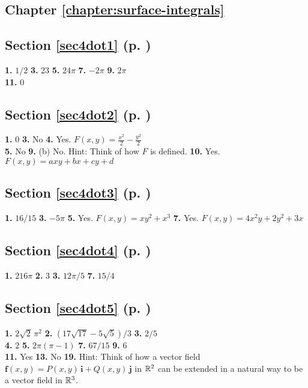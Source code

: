 \begin{multicols}{2}
\section*{Chapter \ref{chapter:surface-integrals}}
\subsection*{Section \ref{sec4dot1} (p. \pageref{sec4dot1})}
\textbf{1.} $1/2$\quad
\textbf{3.} $23$\quad
\textbf{5.} $24\pi$\quad
\textbf{7.} $-2\pi$\quad
\textbf{9.} $2\pi$\\\textbf{11.} $0$
\subsection*{Section \ref{sec4dot2} (p. \pageref{sec4dot2})}
\textbf{1.} $0$\quad
\textbf{3.} No\quad
\textbf{4.} Yes. $F(x,y)=\frac{x^2}{2}-\frac{y^2}{2}$\\
\textbf{5.} No\quad
\textbf{9.} (b) No. Hint: Think of how $F$ is defined.\quad
\textbf{10.} Yes. $F(x,y)=axy+bx+cy+d$
\subsection*{Section \ref{sec4dot3} (p. \pageref{sec4dot3})}
\textbf{1.} $16/15$\quad
\textbf{3.} $-5\pi$\quad
\textbf{5.} Yes. $F(x,y)=xy^2 + x^3$\quad
\textbf{7.} Yes. $F(x,y)=4x^2 y + 2y^2 + 3x$
\subsection*{Section \ref{sec4dot4} (p. \pageref{sec4dot4})}
\textbf{1.} $216\pi$\quad
\textbf{2.} $3$\quad
\textbf{3.} $12\pi/5$\quad
\textbf{7.} $15/4$
\subsection*{Section \ref{sec4dot5} (p. \pageref{sec4dot5})}
\textbf{1.} $2\sqrt{2}\,\pi^2$\quad
\textbf{2.} $(17\sqrt{17} - 5\sqrt{5})/3$\quad
\textbf{3.} $2/5$\\
\textbf{4.} $2$ \quad
\textbf{5.} $2\pi (\pi - 1)$ \quad
\textbf{7.} $67/15$ \quad
\textbf{9.} $6$\\
\textbf{11.} Yes \quad
\textbf{13.} No \quad
\textbf{19.} Hint: Think of how a vector field $\textbf{f}(x,y) = P(x,y)\,\textbf{i} + Q(x,y)\,\textbf{j}$ in
$\mathbb{R}^{2}$ can be extended in a natural way to be a vector field in $\mathbb{R}^{3}$.

\end{multicols}
